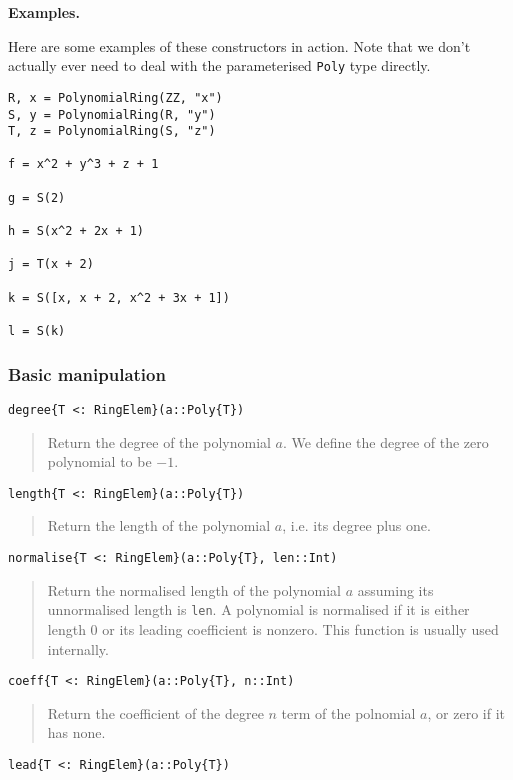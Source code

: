 \documentclass[a4paper,10pt]{article}
\newcommand{\code}{\lstinline}
\newcommand{\desc}[1]{\vspace{-3mm}\begin{quote}#1\end{quote}}
\begin{document}
\textbf{Examples.}

Here are some examples of these constructors in action. Note that we don't actually
ever need to deal with the parameterised \code{Poly} type directly.

\begin{lstlisting}
R, x = PolynomialRing(ZZ, "x")
S, y = PolynomialRing(R, "y")
T, z = PolynomialRing(S, "z")

f = x^2 + y^3 + z + 1

g = S(2)

h = S(x^2 + 2x + 1)

j = T(x + 2)

k = S([x, x + 2, x^2 + 3x + 1])

l = S(k)
\end{lstlisting}

\subsubsection{Basic manipulation}

\begin{lstlisting}
degree{T <: RingElem}(a::Poly{T})
\end{lstlisting}

\desc{Return the degree of the polynomial $a$. We define the degree of the zero
polynomial to be $-1$.}

\begin{lstlisting}
length{T <: RingElem}(a::Poly{T})
\end{lstlisting}

\desc{Return the length of the polynomial $a$, i.e. its degree plus one.}

\begin{lstlisting}
normalise{T <: RingElem}(a::Poly{T}, len::Int)
\end{lstlisting}

\desc{Return the normalised length of the polynomial $a$ assuming its unnormalised
length is \code{len}. A polynomial is normalised if it is either length $0$ or its
leading coefficient is nonzero. This function is usually used internally.}

\begin{lstlisting}
coeff{T <: RingElem}(a::Poly{T}, n::Int)
\end{lstlisting}

\desc{Return the coefficient of the degree $n$ term of the polnomial $a$, or zero
if it has none.}

\begin{lstlisting}
lead{T <: RingElem}(a::Poly{T})
\end{lstlisting}
\end{document}
